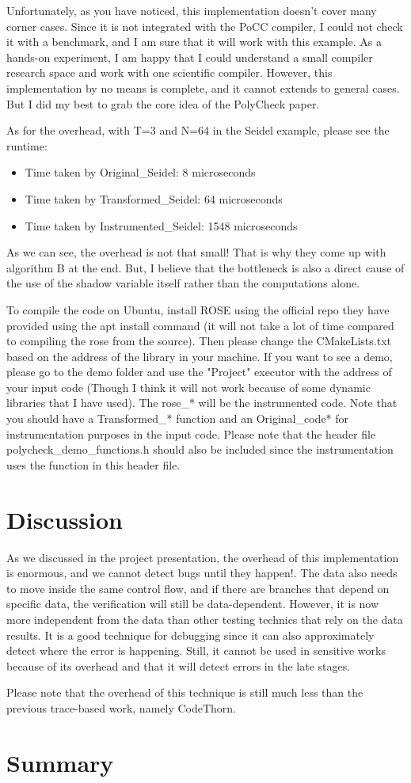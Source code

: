\documentclass[letterpaper,12pt]{article}
\begin{document}
Unfortunately, as you have noticed, this implementation doesn't cover many corner cases. Since it is not integrated with the PoCC compiler, I could not check it with a benchmark, and I am sure that it will work with this example. As a hands-on experiment, I am happy that I could understand a small compiler research space and work with one scientific compiler. However, this implementation by no means is complete, and it cannot extends to general cases. But I did my best to grab the core idea of the PolyCheck paper.

As for the overhead, with T=3 and N=64 in the Seidel example, please see the runtime:
\begin{itemize}
	\item Time taken by Original\_Seidel: 8 microseconds
	\item Time taken by Transformed\_Seidel: 64 microseconds
	\item Time taken by Instrumented\_Seidel: 1548 microseconds
\end{itemize}

As we can see, the overhead is not that small! That is why they come up with algorithm B at the end. But, I believe that the bottleneck is also a direct cause of the use of the shadow variable itself rather than the computations alone.

To compile the code on Ubuntu, install ROSE using the official repo they have provided using the apt install command (it will not take a lot of time compared to compiling the rose from the source). Then please change the CMakeLists.txt based on the address of the library in your machine. If you want to see a demo, please go to the demo folder and use the "Project" executor with the address of your input code (Though I think it will not work because of some dynamic libraries that I have used). The rose\_* will be the instrumented code. Note that you should have a Transformed\_* function and an Original\_code* for instrumentation purposes in the input code. Please note that the header file polycheck\_demo\_functions.h should also be included since the instrumentation uses the function in this header file.
	
	\section{Discussion}
	
	As we discussed in the project presentation, the overhead of this implementation is enormous, and we cannot detect bugs until they happen!. The data also needs to move inside the same control flow, and if there are branches that depend on specific data, the verification will still be data-dependent. However, it is now more independent from the data than other testing technics that rely on the data results. It is a good technique for debugging since it can also approximately detect where the error is happening. Still, it cannot be used in sensitive works because of its overhead and that it will detect errors in the late stages. 


	Please note that the overhead of this technique is still much less than the previous trace-based work, namely CodeThorn.

	\section{Summary}
	
	
	
	
\end{document}
